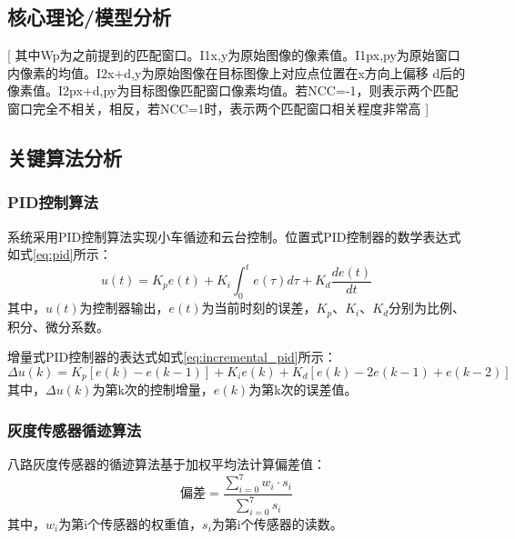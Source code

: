 \documentclass[UTF-8,zihao=-4]{ctexart}
\begin{document}
\subsection{核心理论/模型分析}
    [ 其中Wp为之前提到的匹配窗口。I1x,y为原始图像的像素值。I1px,py为原始窗口内像素的均值。I2x+d,y为原始图像在目标图像上对应点位置在x方向上偏移 d后的像素值。I2px+d,py为目标图像匹配窗口像素均值。若NCC=-1，则表示两个匹配窗口完全不相关，相反，若NCC=1时，表示两个匹配窗口相关程度非常高 ]
    
    
\subsection{关键算法分析}
\subsubsection{PID控制算法}
    系统采用PID控制算法实现小车循迹和云台控制。位置式PID控制器的数学表达式如式\ref{eq:pid}所示：
    \begin{equation} \label{eq:pid}
        u(t) = K_p e(t) + K_i \int_0^t e(\tau)d\tau + K_d \frac{de(t)}{dt}
    \end{equation}
    其中，$u(t)$为控制器输出，$e(t)$为当前时刻的误差，$K_p$、$K_i$、$K_d$分别为比例、积分、微分系数。
    
    增量式PID控制器的表达式如式\ref{eq:incremental_pid}所示：
    \begin{equation} \label{eq:incremental_pid}
        \Delta u(k) = K_p[e(k)-e(k-1)] + K_i e(k) + K_d[e(k)-2e(k-1)+e(k-2)]
    \end{equation}
    其中，$\Delta u(k)$为第k次的控制增量，$e(k)$为第k次的误差值。

\subsubsection{灰度传感器循迹算法}
    八路灰度传感器的循迹算法基于加权平均法计算偏差值：
    \begin{equation} \label{eq:line_tracking}
        \text{偏差} = \frac{\sum_{i=0}^{7} w_i \cdot s_i}{\sum_{i=0}^{7} s_i}
    \end{equation}
    其中，$w_i$为第i个传感器的权重值，$s_i$为第i个传感器的读数。
\end{document}
